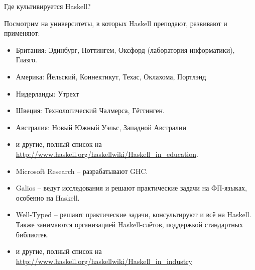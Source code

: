 \newpage
{}

Где культивируется Haskell? 


Посмотрим на университеты, в которых 
Haskell преподают, развивают и применяют:

\begin{itemize}
\item Британия: Эдинбург, Ноттингем, Оксфорд (лаборатория информатики),
    Глазго.

\item Америка: Йельский, Коннектикут, Техас, Оклахома, Портлэнд

\item Нидерланды: Утрехт

\item Швеция: Технологический Чалмерса, Гёттинген. 

\item Австралия: Новый Южный Уэльс, Западной Австралии

\item и другие, полный список на 
\url{http://www.haskell.org/haskellwiki/Haskell_in_education}. 

\end{itemize}


\begin{itemize}
\item Microsoft Research -- разрабатывают GHC.

\item Galios -- ведут исследования и решают практические
задачи на ФП-языках, особенно на Haskell.

\item Well-Typed -- решают практические задачи, консультируют
    и всё на Haskell. Также занимаются организацией Haskell-слётов,
    поддержкой стандартных библиотек. 

\item и другие, полный список на 
\url{http://www.haskell.org/haskellwiki/Haskell_in_industry}

\end{itemize}


